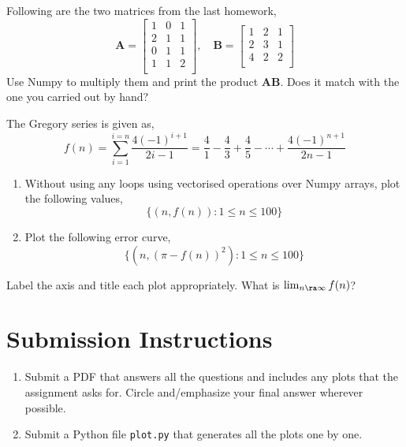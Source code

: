\documentclass{homework}
\begin{document}
\question Following are the two matrices from the last homework,
\[
  \mathbf{A} = \begin{bmatrix} 1 & 0 & 1 \\   2 & 1 & 1 \\   0 & 1 & 1 \\   1 & 1 & 2 \\   \end{bmatrix}, \quad
  \mathbf{B} = \begin{bmatrix} 1 & 2 & 1 \\   2 & 3 & 1 \\   4 & 2 & 2 \\   \end{bmatrix}
\]
Use Numpy to multiply them and print the product $\mathbf{AB}$. Does it match with the one you carried out by hand?

\question The Gregory series is given as,
\[
f(n) = \sum_{i=1}^{i=n}\frac{4(-1)^{i+1}}{2i-1}=\frac{4}{1}-\frac{4}{3}+\frac{4}{5}-\cdots+\frac{4(-1)^{n+1}}{2n-1}
\]
\begin{enumerate}
    \item Without using any loops \ie using vectorised operations over Numpy arrays, plot the following values,
    \[
        \{(n, f(n)) : 1 \leq n \leq 100\}
    \]
    \item Plot the following error curve,
    \[
        \{(n, (\pi - f(n))^2) : 1 \leq n \leq 100\}
    \]
\end{enumerate}
Label the axis and title each plot appropriately. What is $\lim_{n\ra\infty}f(n)$?
\section*{Submission Instructions}

\begin{enumerate}
    \item Submit a PDF that answers all the questions and includes any plots that the assignment asks for. Circle and/emphasize your final answer wherever possible.
    \item Submit a Python file \eg \texttt{plot.py} that generates all the plots one by one.
\end{enumerate}
\end{document}
